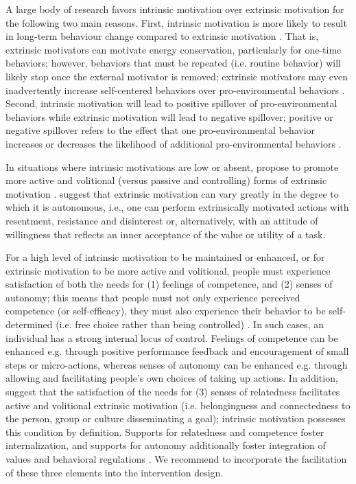 A large body of research favors intrinsic motivation over extrinsic motivation for the following two main reasons. First, intrinsic motivation is more likely to result in long-term behaviour change compared to extrinsic motivation  \citep{He2010}. That is, extrinsic motivators can motivate energy conservation, particularly for one-time behaviors; however, behaviors that must be repeated (i.e. routine behavior) will likely stop once the external motivator is removed; extrinsic motivators may even inadvertently increase self-centered behaviors over pro-environmental behaviors  \citep{Swim2014}. Second, intrinsic motivation will lead to positive spillover of pro-environmental behaviors while extrinsic motivation will lead to negative spillover; positive or negative spillover refers to the effect that one pro-environmental behavior increases or decreases the likelihood of additional pro-environmental behaviors  \citep{thogersen2009simple,Truelove2014,Knowles2014}.

In situations where intrinsic motivations are low or absent, \citet{Ryan2000} propose to promote more active and volitional (versus passive and controlling) forms of extrinsic motivation  \citep{Ryan2000}.  \citep{Ryan2000} suggest that extrinsic motivation can vary greatly in the degree to which it is autonomous, i.e., one can perform extrinsically motivated actions with resentment, resistance and disinterest or, alternatively, with an attitude of willingness that
reflects an inner acceptance of the value or utility of a task.

For a high level of intrinsic motivation to be maintained or enhanced, or for extrinsic motivation to be more active and volitional, people must experience satisfaction of both the needs for (1) feelings of competence, and (2) senses of autonomy; this means that people must not only experience perceived competence (or self-efficacy), they must also experience their behavior to be self-determined (i.e. free choice rather than being controlled)  \citep{Ryan2000}. In such cases, an individual has a strong internal locus of control. Feelings of competence can be enhanced e.g. through positive performance feedback and encouragement of small steps or micro-actions, whereas senses of autonomy can be enhanced e.g. through allowing and facilitating people's own choices of taking up actions. In addition,  \citep{Ryan2000} suggest that the satisfaction of the needs for (3) senses of relatedness facilitates active and volitional extrinsic motivation (i.e. belongingness and connectedness to the person, group or culture disseminating a goal); intrinsic motivation possesses this condition by definition. Supports for relatedness and competence foster internalization, and supports for autonomy additionally foster integration of  values and behavioral regulations  \citep{Ryan2000}. We recommend to incorporate the facilitation of these three elements into the intervention design. 

